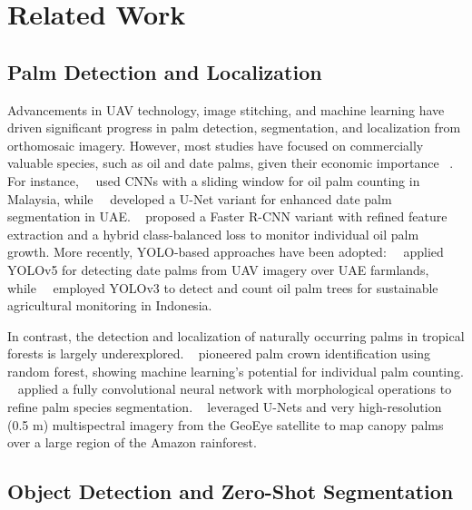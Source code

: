 \section{Related Work}
\label{sec:related}


\subsection{Palm Detection and Localization}

Advancements in UAV technology, image stitching, and machine learning have driven significant progress in palm detection, segmentation, and localization from orthomosaic imagery. However, most studies have focused on commercially valuable species, such as oil and date palms, given their economic importance ~\cite{li2016deep,gibril2021deep,zheng2021growing,jintasuttisak2022deep,putra2023automatic}. For instance,~\citeauthor{li2016deep}~\cite{li2016deep} used CNNs with a sliding window for oil palm counting in Malaysia, while~\citeauthor{gibril2021deep}~\cite{gibril2021deep} developed a U-Net variant for enhanced date palm segmentation in UAE. \citeauthor{zheng2021growing}~\cite{zheng2021growing} proposed a Faster R-CNN variant with refined feature extraction and a hybrid class-balanced loss to monitor individual oil palm growth. More recently, YOLO-based approaches have been adopted:~\citeauthor{jintasuttisak2022deep}~\cite{jintasuttisak2022deep} applied YOLOv5 for detecting date palms from UAV imagery over UAE farmlands, while~\citeauthor{putra2023automatic}~\cite{putra2023automatic} employed YOLOv3 to detect and count oil palm trees for sustainable agricultural monitoring in Indonesia.

In contrast, the detection and localization of naturally occurring palms in tropical forests is largely underexplored. \citeauthor{tagle2019identifying}~\cite{tagle2019identifying} pioneered palm crown identification using random forest, showing machine learning’s potential for individual palm counting. \citeauthor{ferreira2020individual}~\cite{ferreira2020individual} applied a fully convolutional neural network with morphological operations to refine palm species segmentation. \citeauthor{wagner2020regional}~\cite{wagner2020regional} leveraged U-Nets and very high-resolution (0.5 m) multispectral imagery from the GeoEye satellite to map canopy palms over a large region of the Amazon rainforest.

\subsection{Object Detection and Zero-Shot Segmentation}
\label{sec:object}


